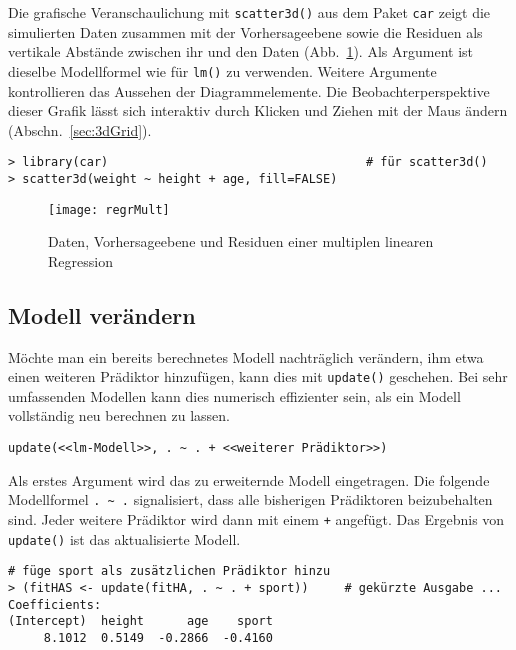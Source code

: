 Die grafische Veranschaulichung mit \lstinline!scatter3d()! aus dem Paket \lstinline!car! zeigt die simulierten Daten zusammen mit der Vorhersageebene sowie die Residuen als vertikale Abstände zwischen ihr und den Daten (Abb.\ \ref{fig:regrMult}). Als Argument ist dieselbe Modellformel wie für \lstinline!lm()! zu verwenden. Weitere Argumente kontrollieren das Aussehen der Diagrammelemente. Die Beobachterperspektive dieser Grafik lässt sich interaktiv durch Klicken und Ziehen mit der Maus ändern (Abschn.\ \ref{sec:3dGrid}).
\begin{lstlisting}
> library(car)                                    # für scatter3d()
> scatter3d(weight ~ height + age, fill=FALSE)
\end{lstlisting}

\begin{figure}[ht]
\centering
\texttt{[image: regrMult]}
\vspace*{-1em}
\caption{Daten, Vorhersageebene und Residuen einer multiplen linearen Regression}
\label{fig:regrMult}
\end{figure}

\subsection{Modell verändern}
\label{sec:regrUpdate}

Möchte man ein bereits berechnetes Modell nachträglich verändern, ihm etwa einen weiteren Prädiktor hinzufügen, kann dies mit \lstinline!update()! geschehen. Bei sehr umfassenden Modellen kann dies numerisch effizienter sein, als ein Modell vollständig neu berechnen zu lassen.
\begin{lstlisting}
update(<<lm-Modell>>, . ~ . + <<weiterer Prädiktor>>)
\end{lstlisting}

Als erstes Argument wird das zu erweiternde Modell eingetragen. Die folgende Modellformel \lstinline!. ~ .! signalisiert, dass alle bisherigen Prädiktoren beizubehalten sind. Jeder weitere Prädiktor wird dann mit einem \lstinline!+! angefügt. Das Ergebnis von \lstinline!update()! ist das aktualisierte Modell.
\begin{lstlisting}
# füge sport als zusätzlichen Prädiktor hinzu
> (fitHAS <- update(fitHA, . ~ . + sport))     # gekürzte Ausgabe ...
Coefficients:
(Intercept)  height      age    sport
     8.1012  0.5149  -0.2866  -0.4160
\end{lstlisting}

